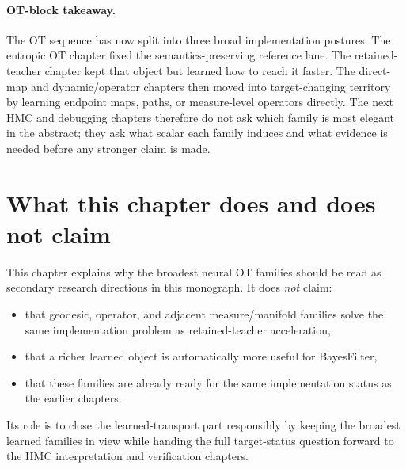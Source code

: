 \paragraph{OT-block takeaway.}
The OT sequence has now split into three broad implementation postures.  The
entropic OT chapter fixed the semantics-preserving reference lane.  The retained-
teacher chapter kept that object but learned how to reach it faster.  The direct-
map and dynamic/operator chapters then moved into target-changing territory by
learning endpoint maps, paths, or measure-level operators directly.  The next HMC
and debugging chapters therefore do not ask which family is most elegant in the
abstract; they ask what scalar each family induces and what evidence is needed
before any stronger claim is made.

\section{What this chapter does and does not claim}
\label{sec:bf-neural-ot-dynamic-boundary}

This chapter explains why the broadest neural OT families should be read as
secondary research directions in this monograph.  It does \emph{not} claim:
\begin{itemize}
  \item that geodesic, operator, and adjacent measure/manifold families solve the
  same implementation problem as retained-teacher acceleration,
  \item that a richer learned object is automatically more useful for
  BayesFilter,
  \item that these families are already ready for the same implementation status
  as the earlier chapters.
\end{itemize}
Its role is to close the learned-transport part responsibly by keeping the
broadest learned families in view while handing the full target-status question
forward to the HMC interpretation and verification chapters.

\FloatBarrier
